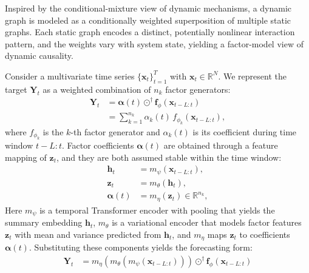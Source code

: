 ﻿\documentclass[journal]{IEEEtran}
\begin{document}
Inspired by the conditional-mixture view of dynamic mechanisms, a dynamic graph is modeled as a conditionally weighted superposition of multiple static graphs. Each static graph encodes a distinct, potentially nonlinear interaction pattern, and the weights vary with system state, yielding a factor-model view of dynamic causality.

Consider a multivariate time series $\{\mathbf{x}_t\}_{t=1}^{T}$ with $\mathbf{x}_t\in\mathbb{R}^{N}$. We represent the target $\mathbf{Y}_t$ as a weighted combination of $n_k$ factor generators:
\begin{equation}
\begin{aligned}
\mathbf{Y}_t&=\boldsymbol{\alpha}(t)\odot^{\dagger}\mathbf{f}_{\phi}\!\left(\mathbf{x}_{t-L:t}\right)\\
&=\sum_{k=1}^{n_k}\alpha_{k}(t)\,f_{\phi_k}\!\left(\mathbf{x}_{t-L:t}\right),
\end{aligned}
\end{equation}
where $f_{\phi_k}$ is the $k$-th factor generator and $\alpha_{k}(t)$ is its coefficient during time window $t-L:t$. Factor coefficients $\boldsymbol{\alpha}(t)$ are obtained through a feature mapping of $\mathbf{z}_{t}$, and they are both assumed stable within the time window:
\begin{equation}
\begin{aligned}
\mathbf{h}_{t}&=m_{\psi}\!\left(\mathbf{x}_{t-L:t}\right),\\
\mathbf{z}_{t}&=m_{\theta}\!\left(\mathbf{h}_{t}\right),\\
\boldsymbol{\alpha}(t)&=m_{\eta}\!\left(\mathbf{z}_{t}\right)\in\mathbb{R}^{n_k},
\end{aligned}
\end{equation}
Here $m_{\psi}$ is a temporal Transformer encoder with pooling that yields the summary embedding $\mathbf{h}_t$, $m_{\theta}$ is a variational encoder that models factor features $\mathbf{z}_t$ with mean and variance predicted from $\mathbf{h}_t$, and $m_{\eta}$ maps $\mathbf{z}_t$ to coefficients $\boldsymbol{\alpha}(t)$. Substituting these components yields the forecasting form:
\begin{equation}
\begin{aligned}
\mathbf{Y}_t&=m_{\eta}\left(m_{\theta}\left(m_{\psi}\!\left(\mathbf{x}_{t-L:t}\right)\right)\right)\odot^{\dagger}\mathbf{f}_{\phi}\!\left(\mathbf{x}_{t-L:t}\right)
\end{aligned}
\end{equation}
\end{document}
